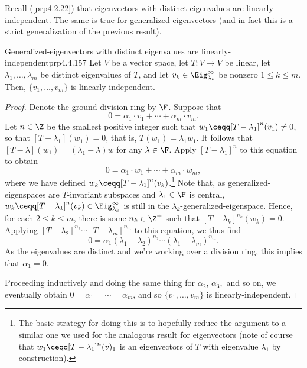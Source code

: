 Recall (\cref{prp4.2.22}) that eigenvectors with distinct eigenvalues are linearly-independent.  The same is true for generalized-eigenvectors (and in fact this is a strict generalization of the previous result).
\begin{prp}{Generalized-eigenvectors with distinct ei\-genvalues are linearly-independent}{prp4.4.157}
	Let $V$ be a vector space, let $T\colon V\rightarrow V$ be linear, let $\lambda _1,\ldots ,\lambda _m$ be distinct eigenvalues of $T$, and let $v_k\in \Eig _{\lambda _k}^{\infty}$ be nonzero $1\leq k\leq m$.  Then, $\{ v_1,\ldots ,v_m\}$ is linearly-independent.
	\begin{proof}
		Denote the ground division ring by $\F$.  Suppose that
		\begin{equation}
			0=\alpha _1\cdot v_1+\cdots +\alpha _m\cdot v_m.
		\end{equation}
		Let $n\in \Z$ be the smallest positive integer such that $w_1\ceqq [T-\lambda _1]^n(v_1)\neq 0$, so that $[T-\lambda _1](w_1)=0$, that is, $T(w_1)=\lambda _1w_1$.  It follows that $[T-\lambda ](w_1)=(\lambda _1-\lambda )w$ for any $\lambda \in \F$.  Apply $[T-\lambda _1]^n$ to this equation to obtain
		\begin{equation}
			0=\alpha _1\cdot w_1+\cdots +\alpha _m\cdot w_m,
		\end{equation}
		where we have defined $w_k\ceqq [T-\lambda _1]^n(v_k)$.\footnote{The basic strategy for doing this is to hopefully reduce the argument to a similar one we used for the analogous result for eigenvectors (note of course that $w_1\ceqq [T-\lambda _1]^n(v)_1$ is an eigenvectors of $T$ with eigenvalue $\lambda _1$ by construction).}  Note that, as generalized-eigenspaces are $T$-invariant subspaces and $\lambda _1\in \F$ is central, $w_k\ceqq [T-\lambda _1]^n(v_k)\in \Eig _{\lambda _k}^{\infty}$ is still in the $\lambda _k$-generalized-eigenspace.  Hence, for each $2\leq k\leq m$, there is some $n_k\in \Z ^+$ such that $[T-\lambda _k]^{n_k}(w_k)=0$.  Applying $[T-\lambda _2]^{n_2}\cdots [T-\lambda _m]^{n_m}$ to this equation, we thus find
		\begin{equation}
			0=\alpha _1(\lambda _1-\lambda _2)^{n_2}\cdots (\lambda _1-\lambda _m)^{n_m}.
		\end{equation}
		As the eigenvalues are distinct and we're working over a division ring, this implies that $\alpha _1=0$.
		
		Proceeding inductively and doing the same thing for $\alpha _2$, $\alpha _3,$ and so on, we eventually obtain $0=\alpha _1=\cdots =\alpha _m$, and so $\{ v_1,\ldots ,v_m\}$ is linearly-independent.
	\end{proof}
\end{prp}

